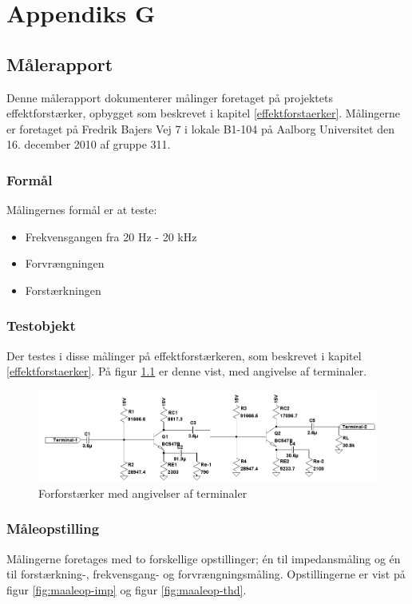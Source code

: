 %
%
\chapter{Appendiks G}
\label{maalejournal}
\section*{Målerapport}
Denne målerapport dokumenterer målinger foretaget på projektets effektforstærker, opbygget som beskrevet i kapitel \ref{effektforstaerker}. Målingerne er foretaget på Fredrik Bajers Vej 7 i lokale B1-104 på Aalborg Universitet den 16. december 2010 af gruppe 311.

\subsection*{Formål}

Målingernes formål er at teste:
\begin{itemize}
\item Frekvensgangen fra 20 Hz - 20 kHz
\item Forvrængningen
\item Forstærkningen
\end{itemize}

\subsection*{Testobjekt}
Der testes i disse målinger på effektforstærkeren, som beskrevet i kapitel \ref{effektforstaerker}. På figur \ref{fig:testob_efforstaerker} er denne vist, med angivelse af terminaler.

\begin{figure}[h]
\centering
\includegraphics[scale=0.42]{maalerapporter/forforstaerker/testobjekt-forforstaerker.png}
\caption{Forforstærker med angivelser af terminaler}
\label{fig:testob_efforstaerker}
\end{figure}

\subsection*{Måleopstilling}
Målingerne foretages med to forskellige opstillinger; én til impedansmåling og én til forstærkning-, frekvensgang- og forvrængningsmåling. Opstillingerne er vist på figur \ref{fig:maaleop-imp} og figur \ref{fig:maaleop-thd}.

